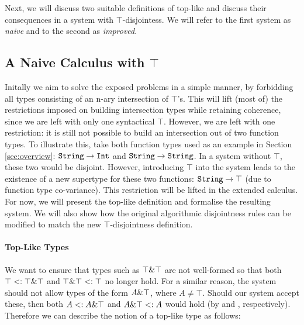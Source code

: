 Next, we will discuss two suitable definitions of top-like and discuss their consequences in a system with
$\top$-disjointess.
We will refer to the first system as \emph{naive} and to the second as \emph{improved}. 

\subsection{A Naive Calculus with $\top$}

Initally we aim to solve the exposed problems in a simple manner,  
by forbidding all types consisting of an n-ary intersection of $\top$'s.
This will lift (most of) the restrictions imposed on building intersection types while retaining coherence,
since we are left with only one syntactical $\top$.
However, we are left with one restriction: it is still not possible to build an intersection out of two function types.
To illustrate this, take both function types used as an example in Section \ref{sec:overview}: 
$\texttt{String} \to \texttt{Int}$ and $\texttt{String} \to \texttt{String}$. 
In a system without $\top$, these two would be disjoint. 
However, introducing $\top$ into the system leads to the existence of a new supertype for these 
two functions: $\texttt{String} \to \top$ (due to function type co-variance). 
This restriction will be lifted in the extended calculus.
For now, we will present the top-like definition and formalise the resulting system. 
We will also show how the original algorithmic disjointness rules can be modified to match the new $\top$-disjointness
definition.


\paragraph{Top-Like Types}

We want to ensure that types such as $\top \& \top$ are not well-formed so that both 
$\top <: \top \& \top$ and $\top \& \top <: \top$ no longer hold.
For a similar reason, the system should not allow types of the form $A \& \top$, where $A \neq \top$.  
Should our system accept these, then both $A <: A \& \top$ and 
$A \& \top <: A$ would hold (by  and , respectively).
Therefore we can describe the notion of a top-like type as follows: 

